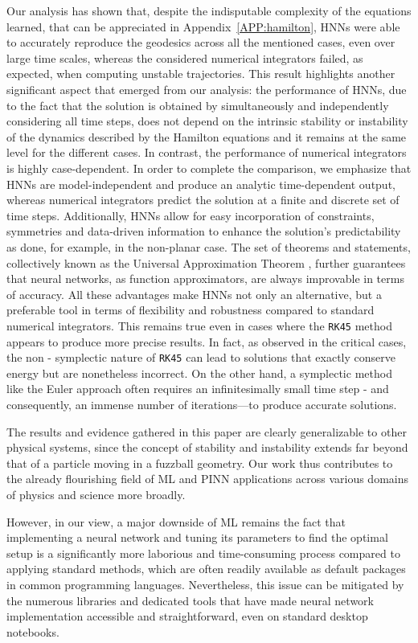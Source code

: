 \documentclass[prd,aps,a4paper,eqsecnum,nofootinbib,floatfix,twocolumn,superscriptaddress]{revtex4-2}
\begin{document}
Our analysis has shown that, despite the indisputable complexity of the equations learned, that can be appreciated in Appendix~\ref{APP:hamilton}, HNNs were able to accurately reproduce the geodesics across all the mentioned cases, even over large time scales, whereas the considered numerical integrators failed, as expected, when computing unstable trajectories. This result highlights another significant aspect that emerged from our analysis: the performance of HNNs, due to the fact that the solution is obtained by simultaneously and independently considering all time steps, does not depend on the intrinsic stability or instability of the dynamics described by the Hamilton equations and it remains at the same level for the different cases. In contrast, the performance of numerical integrators is highly case-dependent. In order to complete the comparison, we emphasize that HNNs are model-independent and produce an analytic time-dependent output, whereas numerical integrators predict the solution at a finite and discrete set of time steps. Additionally, HNNs allow for easy incorporation of constraints, symmetries and data-driven information to enhance the solution’s predictability as done, for example, in the non-planar case. The set of theorems and statements, collectively known as the Universal Approximation Theorem \cite{hornik1989multilayer,Goodfellow-et-al-2016}, further guarantees that neural networks, as function approximators, are always improvable in terms of accuracy. All these advantages make HNNs not only an alternative, but a preferable tool in terms of flexibility and robustness compared to standard numerical integrators. This remains true even in cases where the \texttt{RK45} method appears to produce more precise results. In fact, as observed in the critical cases, the non - symplectic nature of \texttt{RK45} can lead to solutions that exactly conserve energy but are nonetheless incorrect. On the other hand, a symplectic method like the Euler approach often requires an infinitesimally small time step - and consequently, an immense number of iterations—to produce accurate solutions.

The results and evidence gathered in this paper are clearly generalizable to other physical systems, since the concept of stability and instability extends far beyond that of a particle moving in a fuzzball geometry. Our work thus contributes to the already flourishing field of ML and PINN applications across various domains of physics and science more broadly.

However, in our view, a major downside of ML remains the fact that implementing a neural network and tuning its parameters to find the optimal setup is a significantly more laborious and time-consuming process compared to applying standard methods, which are often readily available as default packages in common programming languages. Nevertheless, this issue can be mitigated by the numerous libraries and dedicated tools that have made neural network implementation accessible and straightforward, even on standard desktop notebooks.
\end{document}
